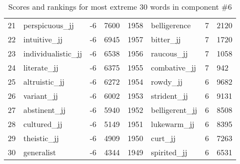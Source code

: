 \begin{table}[tbp]
\begin{tabular}{| rlr@{.}l | rlr@{.}l |}
    21 & perspicuous\_jj & -6 & 7600    &    1958 & belligerence & 7 & 2120 \\
    22 & intuitive\_jj & -6 & 6945    &    1957 & bitter\_jj & 7 & 1720 \\
    23 & individualistic\_jj & -6 & 6538    &    1956 & raucous\_jj & 7 & 1058 \\
    24 & literate\_jj & -6 & 6375    &    1955 & combative\_jj & 7 & 942 \\
    25 & altruistic\_jj & -6 & 6272    &    1954 & rowdy\_jj & 6 & 9682 \\
    26 & variant\_jj & -6 & 6002    &    1953 & strident\_jj & 6 & 9131 \\
    27 & abstinent\_jj & -6 & 5940    &    1952 & belligerent\_jj & 6 & 8508 \\
    28 & cultured\_jj & -6 & 5149    &    1951 & lukewarm\_jj & 6 & 8395 \\
    29 & theistic\_jj & -6 & 4909    &    1950 & curt\_jj & 6 & 7263 \\
    30 & generalist & -6 & 4344    &    1949 & spirited\_jj & 6 & 6531 \\
    \hline
    \end{tabular}
    \caption{Scores and rankings for most extreme 30 words in component \#6} 
\end{table}
\clearpage
